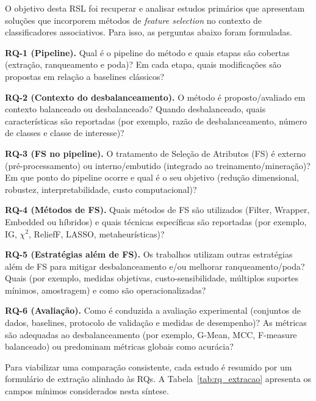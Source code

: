 O objetivo desta RSL foi recuperar e analisar estudos primários que apresentam soluções que incorporem métodos de \textit{feature selection} no contexto de classificadores associativos. Para isso, as perguntas abaixo foram formuladas.

\textbf{RQ-1 (Pipeline).} Qual é o pipeline do método e quais etapas são cobertas (extração, ranqueamento e poda)? Em cada etapa, quais modificações são propostas em relação a baselines clássicos?

\textbf{RQ-2 (Contexto do desbalanceamento).} O método é proposto/avaliado em contexto balanceado ou desbalanceado? Quando desbalanceado, quais características são reportadas (por exemplo, razão de desbalanceamento, número de classes e classe de interesse)?
    
\textbf{RQ-3 (FS no pipeline).} O tratamento de Seleção de Atributos (FS) é externo (pré-processamento) ou interno/embutido (integrado ao treinamento/mineração)? Em que ponto do pipeline ocorre e qual é o seu objetivo (redução dimensional, robustez, interpretabilidade, custo computacional)?
    
\textbf{RQ-4 (Métodos de FS).} Quais métodos de FS são utilizados (Filter, Wrapper, Embedded ou híbridos) e quais técnicas específicas são reportadas (por exemplo, IG, $\chi^2$, ReliefF, LASSO, metaheurísticas)?
    
\textbf{RQ-5 (Estratégias além de FS).} Os trabalhos utilizam outras estratégias além de FS para mitigar desbalanceamento e/ou melhorar ranqueamento/poda? Quais (por exemplo, medidas objetivas, custo-sensibilidade, múltiplos suportes mínimos, amostragem) e como são operacionalizadas?
    
\textbf{RQ-6 (Avaliação).} Como é conduzida a avaliação experimental (conjuntos de dados, baselines, protocolo de validação e medidas de desempenho)? As métricas são adequadas ao desbalanceamento (por exemplo, G-Mean, MCC, F-measure balanceado) ou predominam métricas globais como acurácia?

\noindent Para viabilizar uma comparação consistente, cada estudo é resumido por um formulário de extração alinhado às RQs. A Tabela~\ref{tab:rq_extracao} apresenta os campos mínimos considerados nesta síntese.

